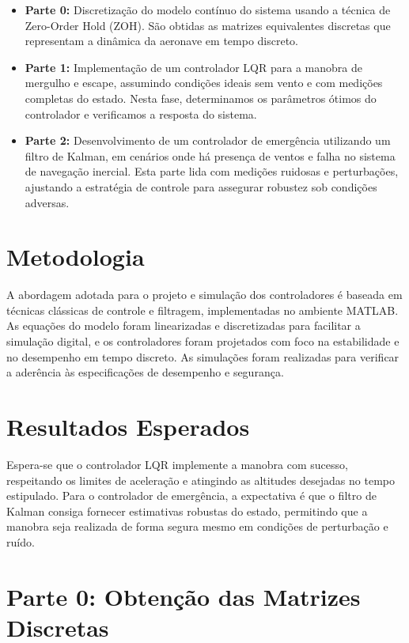 \documentclass[a4paper, 12pt]{article}
\begin{document}
\begin{itemize}
    \item \textbf{Parte 0:} Discretização do modelo contínuo do sistema usando a técnica de Zero-Order Hold (ZOH). São obtidas as matrizes equivalentes discretas que representam a dinâmica da aeronave em tempo discreto.
    \item \textbf{Parte 1:} Implementação de um controlador LQR para a manobra de mergulho e escape, assumindo condições ideais sem vento e com medições completas do estado. Nesta fase, determinamos os parâmetros ótimos do controlador e verificamos a resposta do sistema.
    \item \textbf{Parte 2:} Desenvolvimento de um controlador de emergência utilizando um filtro de Kalman, em cenários onde há presença de ventos e falha no sistema de navegação inercial. Esta parte lida com medições ruidosas e perturbações, ajustando a estratégia de controle para assegurar robustez sob condições adversas.
\end{itemize}




\section{Metodologia}
A abordagem adotada para o projeto e simulação dos controladores é baseada em técnicas clássicas de controle e filtragem, implementadas no ambiente MATLAB. As equações do modelo foram linearizadas e discretizadas para facilitar a simulação digital, e os controladores foram projetados com foco na estabilidade e no desempenho em tempo discreto. As simulações foram realizadas para verificar a aderência às especificações de desempenho e segurança.

\section{Resultados Esperados}
Espera-se que o controlador LQR implemente a manobra com sucesso, respeitando os limites de aceleração e atingindo as altitudes desejadas no tempo estipulado. Para o controlador de emergência, a expectativa é que o filtro de Kalman consiga fornecer estimativas robustas do estado, permitindo que a manobra seja realizada de forma segura mesmo em condições de perturbação e ruído.


\newpage
\section{Parte 0: Obtenção das Matrizes Discretas}
\end{document}
